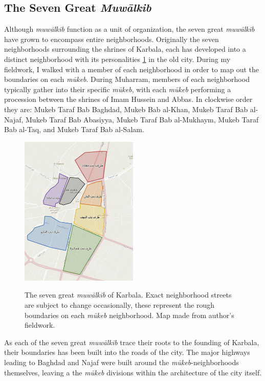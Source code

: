 \subsection{The Seven Great \emph{Muwālkib}}
Although \emph{muwālkib} function as a unit of organization, the seven great \emph{muwālkib} have grown to encompass entire neighborhoods. Originally the seven neighborhoods surrounding the shrines of Karbala, each has developed into a distinct neighborhood with its personalities \ref{fig:mowalkib} in the old city. During my fieldwork, I walked with a member of each neighborhood in order to map out the boundaries on each \emph{mūkeb}. During Muharram, members of each neighborhood typically gather into their specific \emph{mūkeb}, with each \emph{mūkeb} performing a procession between the shrines of Imam Hussein and Abbas. In clockwise order they are:  Mukeb Taraf Bab Baghdad, Mukeb Bab al-Khan, Mukeb Taraf Bab al-Najaf, Mukeb Taraf Bab Abasiyya, Mukeb Taraf Bab al-Mukhaym, Mukeb Taraf Bab al-Taq, and Mukeb Taraf Bab al-Salam.

\begin{figure}
\caption{The seven great \emph{muwālkib} of Karbala. Exact neighborhood streets are subject to change occasionally, these represent the rough boundaries on each \emph{mūkeb} neighborhood. Map made from author's fieldwork.}
\centering
\includegraphics[width=0.5\textwidth]{images/seven-mowkebs.png}
\label{fig:mowalkib}
\end{figure}

As each of the seven great \emph{muwālkib} trace their roots to the founding of Karbala, their boundaries has been built into the roads of the city. The major highways leading to Baghdad and Najaf were built around the \emph{mūkeb}-neighborhoods themselves, leaving a the \emph{mūkeb} divisions within the architecture of the city itself. 

